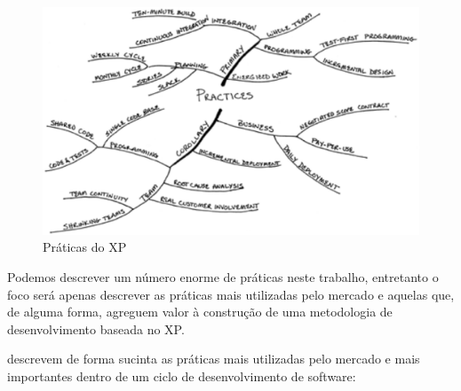 \begin{figure}[ht]
	\centering
	\includegraphics[keepaspectratio=true,scale=0.5]{figuras/fig02.eps}
	\caption{Práticas do XP \cite{Beck:2004}}
	\label{fig02}
\end{figure}

Podemos descrever um número enorme de práticas neste trabalho, entretanto o foco será apenas descrever as práticas mais utilizadas pelo mercado e aquelas que, de alguma forma, agreguem valor à construção de uma metodologia de desenvolvimento baseada no XP.

\cite{Maurer:2002} descrevem de forma sucinta as práticas mais utilizadas pelo mercado e mais importantes dentro de um ciclo de desenvolvimento de software:

